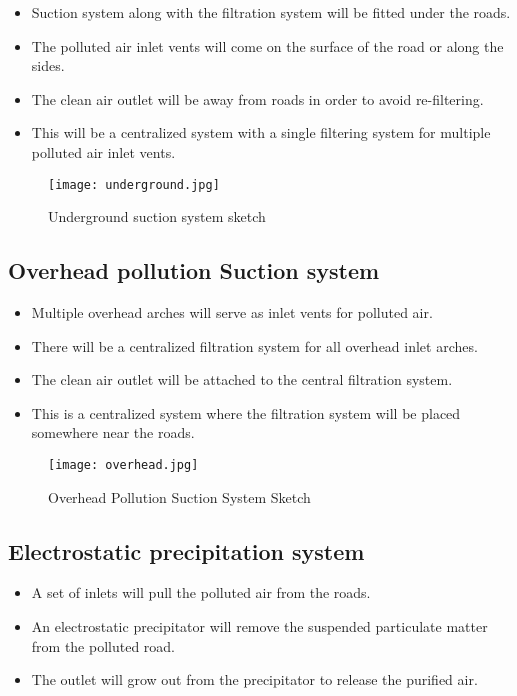\documentclass[12pt]{article}
\begin{document}
\begin{itemize}
\item Suction system along with the filtration system will be fitted under the roads.
\item  The polluted air inlet vents will come on the surface of the road or along the sides.
\item  The clean air outlet will be away from roads in order to avoid re-filtering.
\item This will be a centralized system with a single filtering system for multiple polluted air inlet vents.
\end{itemize}

\begin{figure}[!htb]
\centering
\texttt{[image: underground.jpg]}
\caption{\label{fig:}Underground suction system sketch}
\end{figure}

\newpage

\subsection{Overhead pollution Suction system}

\begin{itemize}
\item Multiple overhead arches will serve as inlet vents for polluted air.
\item There will be a centralized filtration system for all overhead inlet arches.
\item The clean air outlet will be attached to the central filtration system.
\item This is a centralized system where the filtration system will be placed somewhere near the roads.
\end{itemize}

\begin{figure}[!htb]
\centering
\texttt{[image: overhead.jpg]}
\caption{\label{fig:}Overhead Pollution Suction System Sketch}
\end{figure}

\subsection{Electrostatic precipitation system}

\begin{itemize}
\item  A set of inlets will pull the polluted air from the roads.
\item  An electrostatic precipitator will remove the suspended particulate matter from the polluted road.
\item The outlet will grow out from the precipitator to release the purified air.
\end{itemize}
\end{document}
